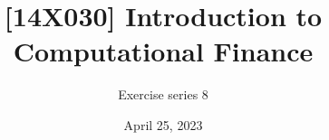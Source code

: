\documentclass[12pt]{article}
\title{[14X030] Introduction to Computational Finance}
\author{Exercise series 8}
\date{\small April 25, 2023}
\begin{document}
 

\maketitle 




\vfill

\vfill
\end{document}

